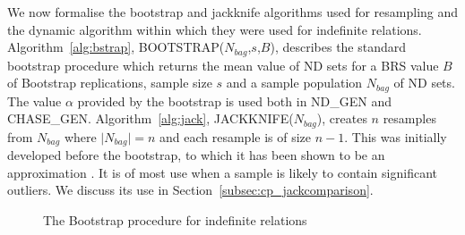 We now formalise the bootstrap and jackknife algorithms used for
resampling and the dynamic algorithm within which they were used for
indefinite relations.
Algorithm~\ref{alg:bstrap}, BOOTSTRAP($N_{bag}$,$s$,$B$),
describes the standard bootstrap procedure which returns the mean value
of ND sets for a BRS value $B$ of Bootstrap replications, sample size $s$ and a
sample population $N_{bag}$ of ND sets. The value $\alpha$
provided by the bootstrap is used both in ND\_GEN and CHASE\_GEN.
Algorithm~\ref{alg:jack}, JACKKNIFE($N_{bag}$), creates $n$ resamples
from $N_{bag}$ where $\mid N_{bag} \mid = n$ and each resample is of
size $n - 1$. This was initially developed before the bootstrap, to
which it has been shown to be an approximation \cite{et86}. It is of
most use when a sample is likely to contain significant outliers. We
discuss its use in Section~\ref{subsec:cp_jackcomparison}. 


{\line
\begin{figure}[ht]
\begin{center}
\caption{\label{cp:fig:bootstrap} The Bootstrap procedure for
indefinite relations}
\end{center}
\end{figure}
}


